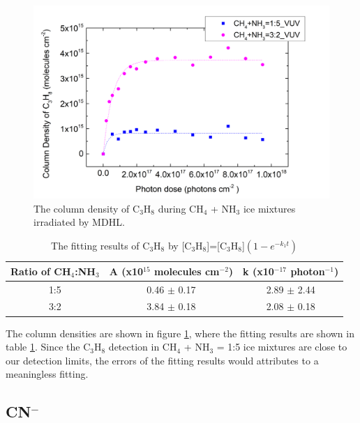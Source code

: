 \begin{figure}
\centering
\includegraphics[width=\textwidth]{figures/chapter3/C3H8_VUV.png}
\caption{The column density of C$_3$H$_8$ during CH$_4$ + NH$_3$ ice mixtures irradiated by MDHL. }
\label{fig:lab_C3H8}
\end{figure}

\begin{table}[htbp]
\caption{The fitting results of C$_3$H$_8$ by [C$_3$H$_8$]=[C$_3$H$_8$]$(1 - e^{-k_1 t})$}
\label{tab:fittingC3H8}
\begin{tabular}{ccc}
\hline
\hline
Ratio of CH$_4$:NH$_3$ & A (x10$^{15}$ molecules cm$^{-2}$) & k (x10$^{-17}$ photon$^{-1}$) \\
\hline
1:5 & 0.46 $\pm$ 0.17 & 2.89 $\pm$ 2.44 \\
3:2 & 3.84 $\pm$ 0.18 & 2.08 $\pm$ 0.18 \\
\hline
\end{tabular}
\end{table}

The column densities are shown in figure \ref{fig:lab_C3H8}, where the fitting results are shown in table \ref{tab:fittingC3H8}. Since the C$_3$H$_8$ detection in CH$_4$ + NH$_3$ = 1:5 ice mixtures are close to our detection limits, the errors of the fitting results would attributes to a meaningless fitting.


\subsection{CN$^-$}




